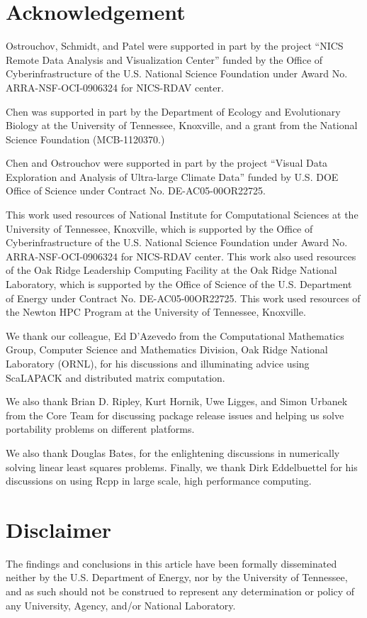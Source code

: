 
\section*{Acknowledgement}

Ostrouchov, Schmidt, and Patel were supported in part by the project
``NICS Remote Data Analysis and Visualization Center''
funded by the Office of Cyberinfrastructure of the
U.S. National Science Foundation
under Award No. ARRA-NSF-OCI-0906324 for NICS-RDAV center.

Chen was supported in part by
the Department of Ecology and Evolutionary Biology at the
University of Tennessee, Knoxville, and a grant from
the National Science Foundation (MCB-1120370.)

Chen and Ostrouchov were supported in part by the project
``Visual Data Exploration and Analysis of Ultra-large Climate Data''
funded by U.S. DOE Office of Science
under Contract No. DE-AC05-00OR22725.

This work used resources of National Institute for Computational
Sciences at the University of Tennessee, Knoxville, which is supported
by the Office of Cyberinfrastructure of the U.S. National Science Foundation
under Award No. ARRA-NSF-OCI-0906324 for NICS-RDAV center.
This work also used resources of the Oak Ridge Leadership Computing Facility
at the Oak Ridge National Laboratory, which is supported by the Office of
Science of the U.S. Department of Energy under Contract No. DE-AC05-00OR22725.
This work used resources of the Newton HPC Program at the University of Tennessee, 
Knoxville. 

We thank our colleague, Ed D'Azevedo
from the Computational Mathematics Group,
Computer Science and Mathematics Division,
Oak Ridge National Laboratory (ORNL),
for his discussions and illuminating advice using 
ScaLAPACK and distributed matrix computation.

We also thank Brian D. Ripley, Kurt Hornik, Uwe Ligges, and Simon Urbanek
from the  Core Team for discussing package release issues and
helping us solve portability problems on different platforms.

We also thank Douglas Bates, for the enlightening discussions in numerically solving linear least squares problems.  Finally, we thank Dirk Eddelbuettel for his discussions on using Rcpp in large scale, high performance computing.


\section*{Disclaimer}

The findings and conclusions in this article have been formally disseminated
neither by the U.S. Department of Energy, nor by the University of Tennessee,
and as such should not be construed to represent any determination or policy of
any University, Agency, and/or National Laboratory.
